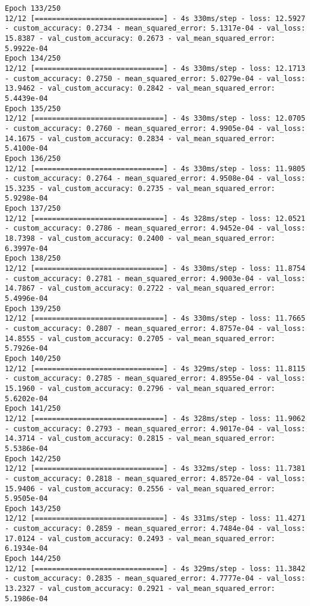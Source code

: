 \begin{lstlisting}
Epoch 133/250
12/12 [==============================] - 4s 330ms/step - loss: 12.5927 - custom_accuracy: 0.2734 - mean_squared_error: 5.1317e-04 - val_loss: 15.8387 - val_custom_accuracy: 0.2673 - val_mean_squared_error: 5.9922e-04
Epoch 134/250
12/12 [==============================] - 4s 330ms/step - loss: 12.1713 - custom_accuracy: 0.2750 - mean_squared_error: 5.0279e-04 - val_loss: 13.9462 - val_custom_accuracy: 0.2842 - val_mean_squared_error: 5.4439e-04
Epoch 135/250
12/12 [==============================] - 4s 330ms/step - loss: 12.0705 - custom_accuracy: 0.2760 - mean_squared_error: 4.9905e-04 - val_loss: 14.1675 - val_custom_accuracy: 0.2834 - val_mean_squared_error: 5.4100e-04
Epoch 136/250
12/12 [==============================] - 4s 330ms/step - loss: 11.9805 - custom_accuracy: 0.2764 - mean_squared_error: 4.9508e-04 - val_loss: 15.3235 - val_custom_accuracy: 0.2735 - val_mean_squared_error: 5.9298e-04
Epoch 137/250
12/12 [==============================] - 4s 328ms/step - loss: 12.0521 - custom_accuracy: 0.2786 - mean_squared_error: 4.9452e-04 - val_loss: 18.7398 - val_custom_accuracy: 0.2400 - val_mean_squared_error: 6.3997e-04
Epoch 138/250
12/12 [==============================] - 4s 330ms/step - loss: 11.8754 - custom_accuracy: 0.2781 - mean_squared_error: 4.9003e-04 - val_loss: 14.7867 - val_custom_accuracy: 0.2722 - val_mean_squared_error: 5.4996e-04
Epoch 139/250
12/12 [==============================] - 4s 330ms/step - loss: 11.7665 - custom_accuracy: 0.2807 - mean_squared_error: 4.8757e-04 - val_loss: 14.8555 - val_custom_accuracy: 0.2705 - val_mean_squared_error: 5.7926e-04
Epoch 140/250
12/12 [==============================] - 4s 329ms/step - loss: 11.8115 - custom_accuracy: 0.2785 - mean_squared_error: 4.8955e-04 - val_loss: 15.1960 - val_custom_accuracy: 0.2796 - val_mean_squared_error: 5.6202e-04
Epoch 141/250
12/12 [==============================] - 4s 328ms/step - loss: 11.9062 - custom_accuracy: 0.2793 - mean_squared_error: 4.9017e-04 - val_loss: 14.3714 - val_custom_accuracy: 0.2815 - val_mean_squared_error: 5.5386e-04
Epoch 142/250
12/12 [==============================] - 4s 332ms/step - loss: 11.7381 - custom_accuracy: 0.2818 - mean_squared_error: 4.8572e-04 - val_loss: 15.9406 - val_custom_accuracy: 0.2556 - val_mean_squared_error: 5.9505e-04
Epoch 143/250
12/12 [==============================] - 4s 331ms/step - loss: 11.4271 - custom_accuracy: 0.2859 - mean_squared_error: 4.7484e-04 - val_loss: 17.0124 - val_custom_accuracy: 0.2493 - val_mean_squared_error: 6.1934e-04
Epoch 144/250
12/12 [==============================] - 4s 329ms/step - loss: 11.3842 - custom_accuracy: 0.2835 - mean_squared_error: 4.7777e-04 - val_loss: 13.2327 - val_custom_accuracy: 0.2921 - val_mean_squared_error: 5.1986e-04

\end{lstlisting}
